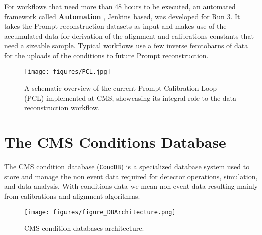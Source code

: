 \newline \newline
For workflows that need more than 48 hours to be executed, an automated framework called \textbf{Automation} \cite{Pigazzini:2853679}, Jenkins based, was developed for Run 3. It takes the Prompt reconstruction datasets as input and makes use of the accumulated data for derivation of the alignment and calibrations constants that need a sizeable sample. Typical workflows use a few inverse femtobarns of data for the uploads of the conditions to future Prompt reconstruction.  






\begin{figure}[h!]	
\centering
\texttt{[image: figures/PCL.jpg]} %
\caption{A schematic overview of the current Prompt Calibration Loop (PCL) implemented at CMS, showcasing its integral role to the data reconstruction workflow.} %
\label{fig:PCL}
\end{figure}

\section{The CMS Conditions Database}

The CMS condition database (\texttt{CondDB}) is a specialized database system used to store and manage the non event data required for detector operations, simulation, and data analysis.
With conditions data we mean non-event data resulting mainly from calibrations and alignment algorithms.

\begin{figure}[h!]	
\centering
\texttt{[image: figures/figure\_DBArchitecture.png]} %
\caption{CMS condition databases architecture. \cite{Gruttola_2010}} 
\label{fig:CondDB}
\end{figure}

